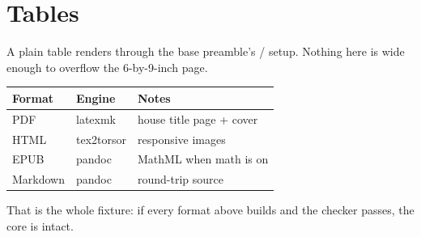 \chapter{Tables}

A plain table renders through the base preamble's /
setup. Nothing here is wide enough to overflow the 6-by-9-inch page.

\begin{center}
\begin{tabular}{lll}
\toprule
Format & Engine & Notes \\
\midrule
PDF      & latexmk         & house title page + cover \\
HTML     & tex2torsor      & responsive images \\
EPUB     & pandoc          & MathML when math is on \\
Markdown & pandoc          & round-trip source \\
\bottomrule
\end{tabular}
\end{center}

That is the whole fixture: if every format above builds and the checker passes,
the core is intact.
